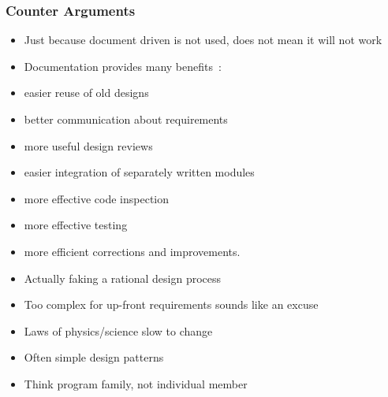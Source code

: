 \documentclass[t,12pt,numbers,fleqn]{beamer}
\begin{document}
\begin{frame}
\frametitle{Counter Arguments}

\begin {itemize}

\item Just because document driven is not used, does not mean it will not work
\item Documentation provides many
benefits~\cite{Parnas2010}: 
\bi
\item easier reuse of old designs
\item better communication about requirements
\item more useful design reviews
\item easier integration of separately
written modules
\item more effective code inspection
\item more effective testing
\item more efficient corrections and improvements.
\ei
\item Actually faking a rational design process
\item Too complex for up-front requirements sounds like an excuse
\bi
\item Laws of physics/science slow to change
\item Often simple design patterns
\item Think program family, not individual member
\ei
\end{itemize}

\end{frame}

\end{document}
